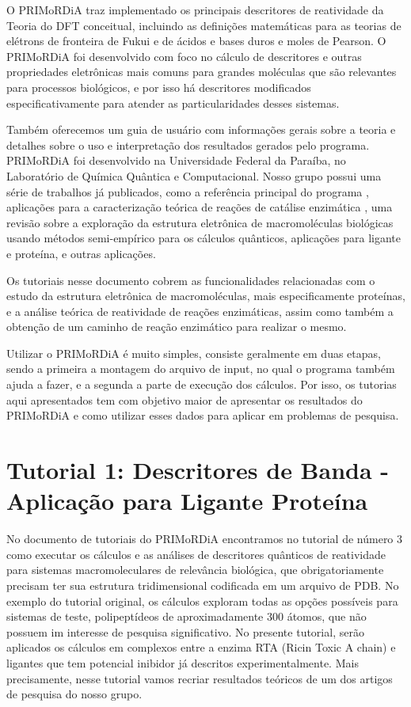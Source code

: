 \documentclass[a4paper,11pt]{refart}
\begin{document}
	O PRIMoRDiA traz implementado os principais descritores de reatividade da Teoria do DFT conceitual, incluindo as definições matemáticas para as teorias de elétrons de fronteira de Fukui e de ácidos e bases duros e moles de Pearson. O PRIMoRDiA foi desenvolvido com foco no cálculo de descritores e outras propriedades eletrônicas mais comuns para grandes moléculas que são relevantes para processos biológicos, e por isso há descritores modificados especificativamente para atender as particularidades desses sistemas. 
	
	Também oferecemos um guia de usuário com informações gerais sobre a teoria e detalhes sobre o uso e interpretação dos resultados gerados pelo programa.  PRIMoRDiA foi desenvolvido na Universidade Federal da Paraíba, no Laboratório de Química Quântica e Computacional. Nosso grupo possui uma série de trabalhos já publicados, como a referência principal do programa , aplicações para a caracterização teórica de reações de catálise enzimática \cite{grillo_primordia_2020}, uma revisão sobre a exploração da estrutura eletrônica de macromoléculas biológicas usando métodos semi-empírico para os cálculos quânticos\cite{grillo_quantum_2023}, aplicações para ligante e proteína\cite{grillo_semiempirical_2020,rocha-santos_thermochemical_2021}, e outras aplicações\cite{grillo_elucidating_2020,grillo_theoretical_2020}.
	
	Os tutoriais nesse documento cobrem as funcionalidades relacionadas com o estudo da estrutura eletrônica de macromoléculas, mais especificamente proteínas, e a análise teórica de reatividade de reações enzimáticas, assim como também a obtenção de um caminho de reação enzimático para realizar o mesmo. 
	
	Utilizar o PRIMoRDiA é muito simples, consiste geralmente em duas etapas, sendo a primeira a montagem do arquivo de input, no qual o programa também ajuda a fazer, e a segunda a parte de execução dos cálculos. Por isso, os tutorias aqui apresentados tem com objetivo maior de apresentar os resultados do PRIMoRDiA e como utilizar esses dados para aplicar em problemas de pesquisa.
		
	\section{Tutorial 1: Descritores de Banda - Aplicação para Ligante Proteína}
	
	No documento de tutoriais do PRIMoRDiA encontramos no tutorial de número 3 como executar os cálculos e as análises de descritores quânticos de reatividade para sistemas macromoleculares de relevância biológica, que obrigatoriamente precisam ter sua estrutura tridimensional codificada em um arquivo de PDB. No exemplo do tutorial original, os cálculos exploram todas as opções possíveis para sistemas de teste, polipeptídeos de aproximadamente 300 átomos,  que não possuem im interesse de pesquisa significativo. No presente tutorial, serão aplicados os cálculos em complexos entre a enzima RTA (Ricin Toxic A chain) e ligantes que tem potencial inibidor já descritos experimentalmente. Mais precisamente, nesse tutorial vamos recriar resultados teóricos de um dos artigos de pesquisa do nosso grupo\cite{rocha-santos_thermochemical_2021}. 
	
\end{document}
